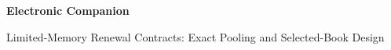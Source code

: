 \documentclass[11pt,letterpaper]{article}
\theoremstyle{definition}\newtheorem{assumption}[theorem]{Assumption}
\begin{document}
\begin{center}{\Large\bfseries Electronic Companion}\par
Limited-Memory Renewal Contracts: Exact Pooling and Selected-Book Design\end{center}

\clearpage

\end{document}
